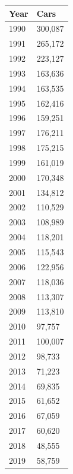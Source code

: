 \documentclass{article}
\begin{document}
\begin{tabular}{ll}
\toprule
Year & Cars \\
\midrule
1990 & 300,087 \\
1991 & 265,172 \\
1992 & 223,127 \\
1993 & 163,636 \\
1994 & 163,535 \\
1995 & 162,416 \\
1996 & 159,251 \\
1997 & 176,211 \\
1998 & 175,215 \\
1999 & 161,019 \\
2000 & 170,348 \\
2001 & 134,812 \\
2002 & 110,529 \\
2003 & 108,989 \\
2004 & 118,201 \\
2005 & 115,543 \\
2006 & 122,956 \\
2007 & 118,036 \\
2008 & 113,307 \\
2009 & 113,810 \\
2010 & 97,757 \\
2011 & 100,007 \\
2012 & 98,733 \\
2013 & 71,223 \\
2014 & 69,835 \\
2015 & 61,652 \\
2016 & 67,059 \\
2017 & 60,620 \\
2018 & 48,555 \\
2019 & 58,759 \\
\bottomrule
\end{tabular}
\end{document}
